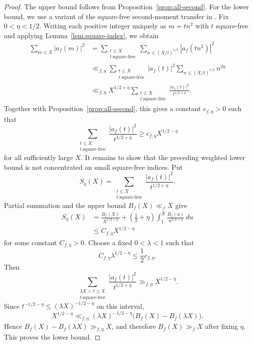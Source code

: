 \documentclass[11pt]{amsart}
\theoremstyle{remark}
\begin{document}
\begin{proof}
The upper bound follows from Proposition~\ref{prop:all-second}. For the
lower bound, we use a variant of the square-free second-moment transfer in
\cite[Lemma~9]{LRW}. Fix $0<\eta<1/2$. Writing each positive integer
uniquely as $m=tn^2$ with $t$ square-free and applying
Lemma~\ref{lem:square-index}, we obtain
\begin{align*}
\sum_{m\leq X}|a_f(m)|^2
&=\sum_{\substack{t\leq X\\t\ \mathrm{square\text{-}free}}}
  \sum_{n\leq (X/t)^{1/2}}|a_f(tn^2)|^2\\
&\ll_{f,\eta}
  \sum_{\substack{t\leq X\\t\ \mathrm{square\text{-}free}}}
  |a_f(t)|^2\sum_{n\leq (X/t)^{1/2}}n^{2\eta}\\
&\ll_{f,\eta}X^{1/2+\eta}
  \sum_{\substack{t\leq X\\t\ \mathrm{square\text{-}free}}}
  \frac{|a_f(t)|^2}{t^{1/2+\eta}}.
\end{align*}
Together with Proposition~\ref{prop:all-second}, this gives a constant
$c_{f,\eta}>0$ such that
\[
\sum_{\substack{t\leq X\\t\ \mathrm{square\text{-}free}}}
\frac{|a_f(t)|^2}{t^{1/2+\eta}}
\geq c_{f,\eta}X^{1/2-\eta}
\]
for all sufficiently large $X$.
It remains to show that the preceding weighted lower bound is not
concentrated on small square-free indices. Put
\[
S_\eta(X)=
\sum_{\substack{t\leq X\\t\ \mathrm{square\text{-}free}}}
\frac{|a_f(t)|^2}{t^{1/2+\eta}}.
\]
Partial summation and the upper bound $B_f(X)\ll_fX$ give
\begin{align*}
S_\eta(X)
&=\frac{B_f(X)}{X^{1/2+\eta}}
 +\left(\frac12+\eta\right)
  \int_1^X\frac{B_f(u)}{u^{3/2+\eta}}\,du\\
&\leq C_{f,\eta}X^{1/2-\eta}
\end{align*}
for some constant $C_{f,\eta}>0$. Choose a fixed $0<\lambda<1$ such that
\[
C_{f,\eta}\lambda^{1/2-\eta}\leq\frac12c_{f,\eta}.
\]
Then
\[
\sum_{\substack{\lambda X<t\leq X\\t\ \mathrm{square\text{-}free}}}
\frac{|a_f(t)|^2}{t^{1/2+\eta}}
\gg_{f,\eta}X^{1/2-\eta}.
\]
Since $t^{-1/2-\eta}\leq(\lambda X)^{-1/2-\eta}$ on this interval,
\[
X^{1/2-\eta}
\ll_{f,\eta}
(\lambda X)^{-1/2-\eta}\bigl(B_f(X)-B_f(\lambda X)\bigr).
\]
Hence $B_f(X)-B_f(\lambda X)\gg_{f,\eta}X$, and therefore
$B_f(X)\gg_fX$ after fixing $\eta$. This proves the lower bound.
\end{proof}
\end{document}
